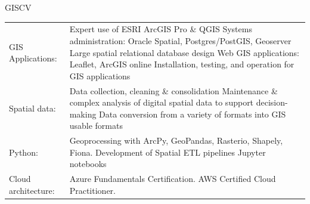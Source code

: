 \documentclass[letterpaper]{article}
\newenvironment{skillslist}
        {
            \begin{tabular}[t]{ l L{5.17in} }
        }{
            \end{tabular}
        }
\begin{document}
    \begin{taggedblock}{GISCV}
        \begin{skillslist}
            GIS Applications:&
                Expert use of ESRI ArcGIS Pro \& QGIS \linebreak
                Systems administration: Oracle Spatial, Postgres/PostGIS, Geoserver \linebreak
                Large spatial relational database design \linebreak
                Web GIS applications: Leaflet, ArcGIS online \linebreak
                Installation, testing, and operation for GIS applications \linebreak
                \\
            Spatial data:&
                Data collection, cleaning \& consolidation \linebreak
                Maintenance \& complex analysis of digital spatial data to support decision-making \linebreak
                Data conversion from a variety of formats into GIS usable formats \linebreak
                \\
            Python:&
                Geoprocessing with ArcPy, GeoPandas, Rasterio, Shapely, Fiona. \linebreak
                Development of Spatial ETL pipelines \linebreak
                Jupyter notebooks \linebreak
                \\
            Cloud architecture:&
                Azure Fundamentals Certification. \linebreak
                AWS Certified Cloud Practitioner. \linebreak

\end{skillslist}
\end{taggedblock}
\end{document}

